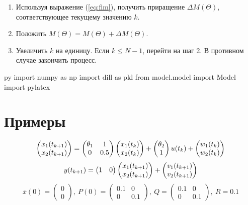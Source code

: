 \documentclass[a4paper,14pt]{extarticle}
\begin{document}
\begin{enumerate}
\item Используя выражение (\ref{eq:fim}), получить приращение
	$\Delta M(\Theta)$, соответствующее текущему значению $k$.

\item Положить $M(\Theta) = M(\Theta) + \Delta M(\Theta)$.

\item Увеличить $k$ на единицу. Если $k \le N-1$, перейти на шаг 2. В противном 
	случае закончить процесс.

\end{enumerate}

\begin{pythontexcustomcode}{py}
import numpy as np
import dill as pkl
from model.model import Model
import pylatex
\end{pythontexcustomcode}

\section{Примеры}

\[
  \begin{pmatrix} x_1(t_{k+1}) \\ x_2(t_{k+1}) \end{pmatrix} =
  \begin{pmatrix} \theta_1 & 1 \\ 0 & 0.5 \end{pmatrix}
  \begin{pmatrix} x_1(t_k) \\ x_2(t_k) \end{pmatrix}
  + 
	\begin{pmatrix} \theta_2 \\ 1 \end{pmatrix}
	u(t_k) 
  + \begin{pmatrix} w_1(t_k) \\ w_2(t_k) \end{pmatrix}
\]
\[
  y(t_{k+1}) =
	\begin{pmatrix} 1 & 0 \end{pmatrix}
	\begin{pmatrix} x_1(t_{k+1}) \\ x_2(t_{k+1}) \end{pmatrix} +
  \begin{pmatrix} v_1(t_{k+1}) \\ v_2(t_{k+1}) \end{pmatrix}
\]
\[
  \overline{x}(0) = \begin{pmatrix} 0 \\ 0 \end{pmatrix},\
  P(0) = \begin{pmatrix} 0.1 & 0 \\ 0 & 0.1 \end{pmatrix},\
  Q = \begin{pmatrix} 0.1 & 0 \\ 0 & 0.1 \end{pmatrix},\
  R = 0.1 
\]
\end{document}
